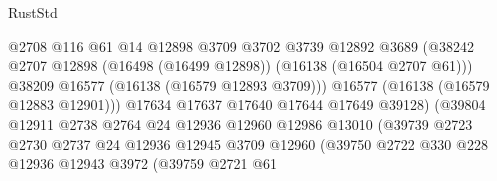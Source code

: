 \begin{lexlean}{RustStd}
\begin{coremodule}
                                          @2708
                                          @116
                                          @61
                                          @14
                                          @12898
                                          @3709
                                          @3702
                                          @3739
                                          @12892
                                          @3689
                                          (@38242
                                            @2707
                                            @12898
                                            (@16498 (@16499 @12898))
                                            (@16138 (@16504 @2707 @61)))
                                          @38209
                                          @16577
                                          (@16138 (@16579 @12893 @3709)))
                                        @16577
                                        (@16138 (@16579 @12883 @12901)))
                                      @17634
                                      @17637
                                      @17640
                                      @17644
                                      @17649
                                      @39128)
                                    (@39804
                                      @12911
                                      @2738
                                      @2764
                                      @24
                                      @12936
                                      @12960
                                      @12986
                                      @13010
                                      (@39739
                                        @2723
                                        @2730
                                        @2737
                                        @24
                                        @12936
                                        @12945
                                        @3709
                                        @12960
                                        (@39750
                                          @2722
                                          @330
                                          @228
                                          @12936
                                          @12943
                                          @3972
                                          (@39759
                                            @2721
                                            @61

\end{coremodule}
\end{lexlean}
